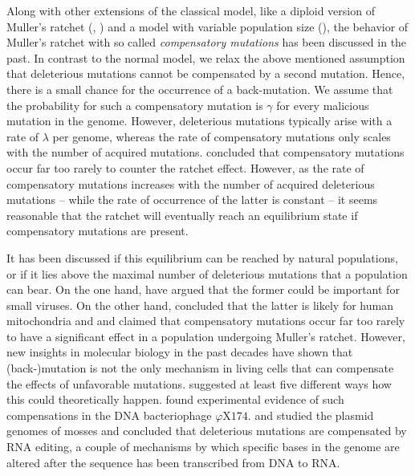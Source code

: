 Along with other extensions of the classical model, like a diploid version of
Muller's ratchet (\cite{pamilo_accumulation_1987},
\cite{charlesworth_rapid_1997}) and a model with variable population size
(\cite{gabriel_mullers_1993}), the behavior of Muller's ratchet with so called
\emph{compensatory mutations} has been discussed in the past. In contrast to the
normal model, we relax the above mentioned assumption that deleterious
mutations cannot be compensated by a second mutation. Hence, there is a
small chance for the occurrence of a back-mutation. We assume that the
probability for such a compensatory mutation is $\gamma$ for every malicious
mutation in the genome. However, deleterious mutations typically arise with a
rate of $\lambda$ per genome, whereas the rate of compensatory mutations only
scales with the number of acquired mutations. \cite{haigh_accumulation_1978}
concluded that compensatory mutations occur far too rarely to counter the
ratchet effect. However, as the rate of compensatory mutations increases
with the number of acquired deleterious mutations -- while the rate of occurrence of the
latter is constant --  it seems reasonable that the ratchet will eventually
reach an equilibrium state if compensatory mutations are present.

It has been discussed if this equilibrium can be reached by natural populations,
or if it lies above the maximal number of deleterious mutations that a
population can bear. On the one hand, \cite{antezana_era_1997} have argued that
the former could be important for small viruses. On the other hand,
\cite{loewe_quantifying_2006} concluded that the latter is likely for human
mitochondria and \cite{chao_fitness_1990} and \cite{smith_evolution_1978}
claimed that compensatory mutations occur far too rarely to have a significant
effect in a population undergoing Muller's ratchet. However, new insights in
molecular biology in the past decades have shown that (back-)mutation is not the
only mechanism in living cells that can compensate the effects of unfavorable
mutations. \cite{maisnier-patin_adaptation_2004} suggested at least five
different ways how this could theoretically happen. \cite{poon_rate_2005} found
experimental evidence of such compensations in the DNA bacteriophage
$\varphi$X$174$. \cite{maier_complex_2008} and
\cite{depperschmidt_mathematical_2011} studied the plasmid genomes of mosses and
concluded that deleterious mutations are compensated by RNA editing, a couple of
mechanisms by which specific bases in the genome are altered after the sequence
has been transcribed from DNA to RNA.

